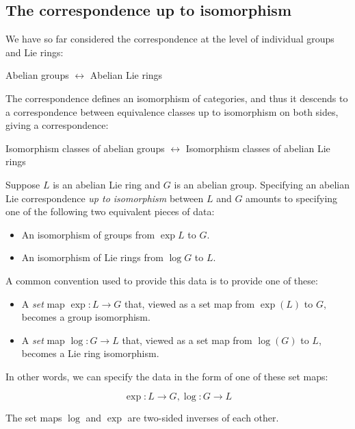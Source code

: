 \subsection{The correspondence up to isomorphism}\label{sec:abelian-lie-correspondence-up-to-isomorphism}

We have so far considered the correspondence at the level of
individual groups and Lie rings:

\begin{center}
  Abelian groups $\leftrightarrow$ Abelian Lie rings
\end{center}

The correspondence defines an isomorphism of categories, and thus it
descends to a correspondence between equivalence classes up to
isomorphism on both sides, giving a correspondence:

\begin{center}
  Isomorphism classes of abelian groups $\leftrightarrow$ Isomorphism classes of abelian Lie rings
\end{center}

Suppose $L$ is an abelian Lie ring and $G$ is an abelian
group. Specifying an abelian Lie correspondence {\em up to
  isomorphism} between $L$ and $G$ amounts to specifying one of the
following two equivalent pieces of data:

\begin{itemize}
\item An isomorphism of groups from $\exp L$ to $G$.
\item An isomorphism of Lie rings from $\log G$ to $L$.
\end{itemize}

A common convention used to provide this data is to provide one of these:

\begin{itemize}
\item A {\em set} map $\exp:L \to G$ that, viewed as a set map from
  $\exp(L)$ to $G$, becomes a group isomorphism.
\item A {\em set} map $\log:G \to L$ that, viewed as a set map from
  $\log(G)$ to $L$, becomes a Lie ring isomorphism.
\end{itemize}

In other words, we can specify the data in the form of one of these set maps:

$$\exp: L \to G, \log: G \to L$$

The set maps $\log$ and $\exp$ are two-sided inverses of each other.

